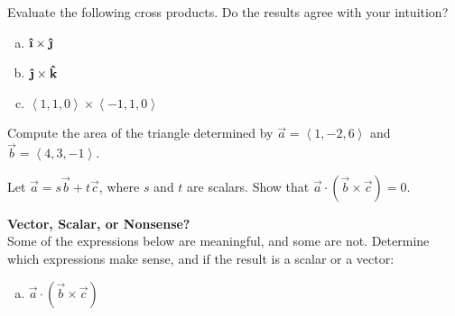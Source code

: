 
\begin{list}{\bf{Problem : }}{}

\item  Evaluate the following cross products.  Do the results agree with your intuition?

\begin{enumerate}[a)]

\item \(\ihat \times \jhat\)

\vfill

\item \(\jhat \times \khat\)

\vfill

\item \(\left\langle 1, 1, 0\right\rangle \times \left\langle -1, 1, 0\right\rangle\)

\vfill

\end{enumerate}


\item Compute the area of the triangle determined by \(\vec{a} = \left\langle 1, -2, 6\right\rangle\) and \(\vec{b} = \left\langle 4, 3, -1\right\rangle\).

\vfill



\item  Let \(\vec{a} = s\vec{b}+t\vec{c}\), where \(s\) and \(t\) are scalars.
  Show that \(\vec{a}\cdot (\vec{b} \times \vec{c}) = 0\).

\vfill


\item \textbf{Vector, Scalar, or Nonsense?}\\Some of the expressions below are meaningful, and some are not.  Determine which expressions make sense, and if the result is a scalar or a vector:

\begin{enumerate}[a)]

\item \(\vec{a} \cdot (\vec{b} \times \vec{c})\)
\vspace*{.25in}


\end{enumerate}
\end{list}
